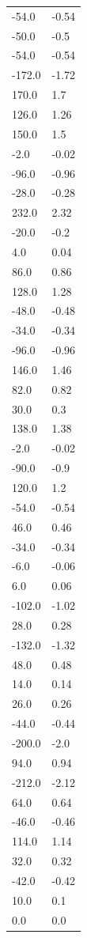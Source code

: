 \begin{longtable}{ll}
-54.0 & -0.54 \\
-50.0 & -0.5 \\
-54.0 & -0.54 \\
-172.0 & -1.72 \\
170.0 & 1.7 \\
126.0 & 1.26 \\
150.0 & 1.5 \\
-2.0 & -0.02 \\
-96.0 & -0.96 \\
-28.0 & -0.28 \\
232.0 & 2.32 \\
-20.0 & -0.2 \\
4.0 & 0.04 \\
86.0 & 0.86 \\
128.0 & 1.28 \\
-48.0 & -0.48 \\
-34.0 & -0.34 \\
-96.0 & -0.96 \\
146.0 & 1.46 \\
82.0 & 0.82 \\
30.0 & 0.3 \\
138.0 & 1.38 \\
-2.0 & -0.02 \\
-90.0 & -0.9 \\
120.0 & 1.2 \\
-54.0 & -0.54 \\
46.0 & 0.46 \\
-34.0 & -0.34 \\
-6.0 & -0.06 \\
6.0 & 0.06 \\
-102.0 & -1.02 \\
28.0 & 0.28 \\
-132.0 & -1.32 \\
48.0 & 0.48 \\
14.0 & 0.14 \\
26.0 & 0.26 \\
-44.0 & -0.44 \\
-200.0 & -2.0 \\
94.0 & 0.94 \\
-212.0 & -2.12 \\
64.0 & 0.64 \\
-46.0 & -0.46 \\
114.0 & 1.14 \\
32.0 & 0.32 \\
-42.0 & -0.42 \\
10.0 & 0.1 \\
0.0 & 0.0 \\

\end{longtable}
